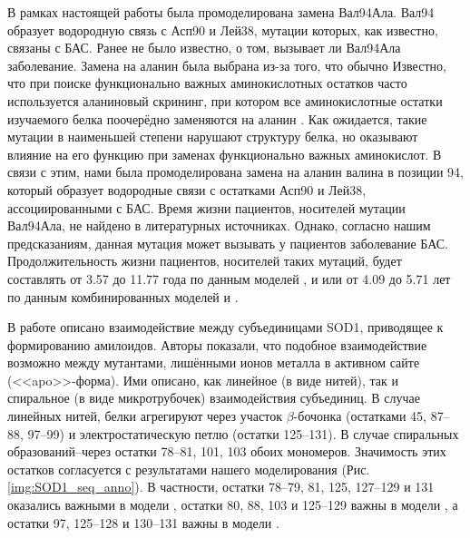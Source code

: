 В рамках настоящей работы была промоделирована замена Вал94Ала. Вал94 образует водородную связь с Асп90 и Лей38, мутации которых, как известно, связаны с БАС. Ранее не было известно, о том, вызывает ли Вал94Ала заболевание. Замена на аланин была выбрана из-за того, что обычно
Известно, что при поиске функционально важных аминокислотных остатков часто используется аланиновый скрининг, при котором все аминокислотные остатки изучаемого белка поочерёдно заменяются на аланин \cite{Cunningham1989}. Как ожидается, такие мутации в наименьшей степени нарушают структуру белка, но оказывают влияние на его функцию при заменах функционально важных аминокислот. В связи с этим, нами была промоделирована замена на аланин валина в позиции 94,  который образует водородные связи с остатками Асп90 и Лей38, ассоциированными с БАС. Время жизни пациентов, носителей мутации Вал94Ала, не найдено в литературных источниках. Однако, согласно нашим предсказаниям, данная мутация может вызывать у пациентов заболевание БАС. Продолжительность жизни пациентов, носителей таких мутаций, будет составлять от 3.57 до 11.77 года по данным моделей \modelpphb{}, \modelpwhb{} и \modelwbr{} или от 4.09 до 5.71 лет по данным комбинированных моделей \modelCLS{} и \modelCRF{}. 

В работе \cite{Elam2003} описано взаимодействие между субъединицами SOD1, приводящее к формированию амилоидов. Авторы показали, что подобное взаимодействие возможно между мутантами, лишёнными ионов металла в активном сайте (<<apo>>-форма). Ими описано, как линейное (в виде нитей), так и спиральное (в виде микротрубочек) взаимодействия субъединиц. В случае линейных нитей, белки агрегируют через участок $\beta$-бочонка (остатками 45, 87–88, 97–99) и электростатическую петлю (остатки 125–131). В случае спиральных образований--через остатки 78–81, 101, 103 обоих мономеров. Значимость этих остатков согласуется с результатами нашего моделирования (Рис. \ref{img:SOD1_seq_anno}). В частности, остатки 78–79, 81, 125, 127–129 и 131 оказались важными в модели \modelpphb{}, остатки 80, 88, 103 и 125–129 важны в модели \modelpwhb{}, а остатки 97, 125–128 и 130–131 важны в модели \modelwbr{}. 

